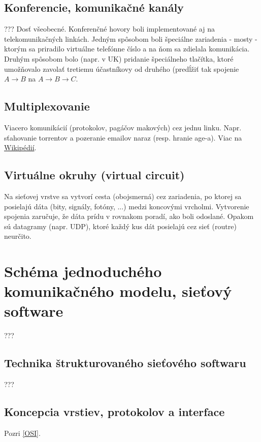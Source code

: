 \documentclass[10pt,a4paper]{article}
\begin{document}
\subsection{Konferencie, komunikačné kanály}  
???
Dosť všeobecné. 
Konferenčné hovory boli implementované aj na telekomunikačných linkách. Jedným spôsobom boli špeciálne zariadenia - mosty - ktorým sa priradilo virtuálne telefónne číslo a na ňom sa zdielala komunikácia. Druhým spôsobom bolo (napr. v UK) pridanie špeciálneho tlačítka, ktoré umožňovalo zavolať tretiemu účastníkovy od druhého (predĺžiť tak spojenie $A \rightarrow B$ na $A \rightarrow B \rightarrow C$. 
  
\subsection{Multiplexovanie}   
\label{multiplexing}
Viacero komunikácií (protokolov, pagáčov makových) cez jednu linku. 
Napr. sťahovanie torrentov a pozeranie emailov naraz (resp. hranie age-a). 
Viac na \href{http://en.wikipedia.org/wiki/Multiplexing}{Wikipédií}.
       
\subsection{Virtuálne okruhy (virtual circuit)}     
Na sieťovej vrstve sa vytvorí cesta (obojsmerná) cez zariadenia, po ktorej sa posielajú dáta (bity, signály, fotóny, ...) medzi koncovými vrcholmi. Vytvorenie spojenia zaručuje, že dáta prídu v rovnakom poradí, ako boli odoslané. Opakom sú datagramy (napr. UDP), ktoré každý kus dát posielajú cez sieť (routre) neurčito.   
    
\section{Schéma jednoduchého komunikačného modelu, sieťový software} 
???

\subsection{Technika štrukturovaného sieťového softwaru} 
???
  
\subsection{Koncepcia vrstiev, protokolov a interface} 
Pozri \ref{OSI}. 
\end{document}
